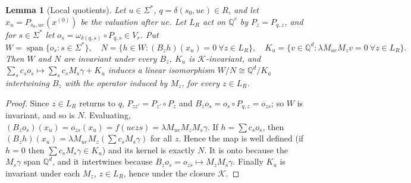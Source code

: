 \documentclass[acmlarge,screen,11pt,nonacm,natbib=false]{acmart}
\newcommand{\Q}{\mathbb{Q}}
\newcommand{\cK}{\mathcal{K}}
\newcommand{\spn}{\operatorname{span}}
\newtheorem{lemma}[theorem]{Lemma}
\theoremstyle{definition}
\begin{document}
\begin{lemma}[Local quotients]\label{lem:local}
Let $u\in\Sigma^*$, $q=\delta(s_0,ue)\in R$, and let $x_u=P_{s_0,ue}(x^{(0)})$ be the valuation after $ue$. Let $L_R$ act on $\Q^r$ by $P_z=P_{q,z}$, and for $s\in\Sigma^*$ let $o_s=\omega_{\delta(q,s)}\circ P_{q,s}\in V_r$. Put
\[
W=\spn\{o_s:s\in\Sigma^*\},\quad N=\{h\in W:(B_zh)(x_u)=0\ \forall z\in L_R\},\quad
K_u=\{v\in\Q^d:\lambda M_{ue}M_zv=0\ \forall z\in L_R\}.
\]
Then $W$ and $N$ are invariant under every $B_z$, $K_u$ is $\cK$-invariant, and $\sum_sc_so_s\mapsto\sum_sc_sM_s\gamma+K_u$ induces a linear isomorphism $W/N\cong\Q^d/K_u$ intertwining $B_z$ with the operator induced by $M_z$, for every $z\in L_R$.
\end{lemma}
\begin{proof}
Since $z\in L_R$ returns to $q$, $P_{zz'}=P_{z'}\circ P_z$ and $B_zo_s=o_s\circ P_{q,z}=o_{zs}$; so $W$ is invariant, and so is $N$. Evaluating, $(B_zo_s)(x_u)=o_{zs}(x_u)=f(uezs)=\lambda M_{ue}M_zM_s\gamma$. If $h=\sum c_so_s$, then $(B_zh)(x_u)=\lambda M_{ue}M_z(\sum c_sM_s\gamma)$ for all $z$. Hence the map is well defined (if $h=0$ then $\sum c_sM_s\gamma\in K_u$) and its kernel is exactly $N$. It is onto because the $M_s\gamma$ span $\Q^d$, and it intertwines because $B_zo_s=o_{zs}\mapsto M_zM_s\gamma$. Finally $K_u$ is invariant under each $M_z$, $z\in L_R$, hence under the closure $\cK$.
\end{proof}
\end{document}
